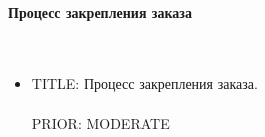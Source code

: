     \paragraph{Процесс закрепления заказа} \mbox{} \\

        \begin{itemize}

	        \item {
	          TITLE: Процесс закрепления заказа.\\
	          \\
	          PRIOR: MODERATE\\
	        }

     	   \end{itemize}


